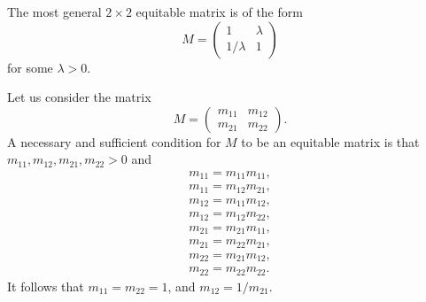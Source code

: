 \documentclass[12pt]{article}
\begin{document}
The most general $2\times 2$ equitable matrix is of the form 
$$
  M = \begin{pmatrix} 1 & \lambda \\
                      1/\lambda & 1
      \end{pmatrix}
$$
for some $\lambda>0$. 

Let us consider the matrix 
$$
  M = \begin{pmatrix} m_{11} & m_{12} \\
                      m_{21} & m_{22}
      \end{pmatrix}.
$$
A necessary and sufficient condition for $M$ to be an equitable matrix
is that $m_{11}, m_{12}, m_{21}, m_{22}>0$ and 
\begin{eqnarray*}
   m_{11} = m_{11} m_{11}, \\
   m_{11} = m_{12} m_{21}, \\
   m_{12} = m_{11} m_{12}, \\
   m_{12} = m_{12} m_{22}, \\
   m_{21} = m_{21} m_{11}, \\
   m_{21} = m_{22} m_{21}, \\
   m_{22} = m_{21} m_{12}, \\
   m_{22} = m_{22} m_{22}.
\end{eqnarray*}
It follows that $m_{11}=m_{22}=1$, and $m_{12} = 1/m_{21}$.
\end{document}
